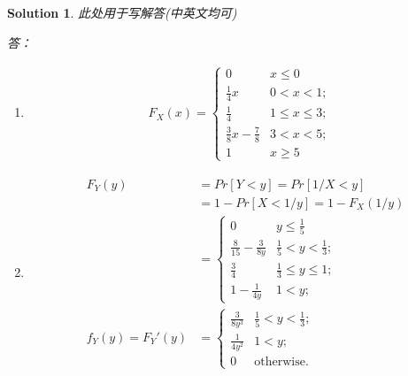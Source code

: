 \documentclass[a4paper,UTF8]{article}
\numberwithin{equation}{section}
\newtheorem*{mySol}{Solution}
\begin{document}
\begin{mySol}
此处用于写解答(中英文均可)

答：
\begin{enumerate}[ {(}1{)}]
\item 
\begin{eqnarray*}
	F_X(x) = 
	\begin{cases}
		0				& x \leq 0 \\
		\frac{1}{4} x 	& 0<x<1;\\
		\frac{1}{4} 	& 1 \leq x \leq 3;\\
		\frac{3}{8} x - \frac{7}{8} & 3<x<5;\\
		1				& x \geq 5 
	\end{cases}
\end{eqnarray*}

\item 
\begin{eqnarray*}
	&F_Y(y)&=Pr[Y<y]=Pr[1/X<y]\\
	&&=1-Pr[X<1/y]=1-F_X(1/y)\\
	&&=
	\begin{cases}
		0				& y \leq \frac{1}{5} \\
		\frac{8}{15}-\frac{3}{8y} &\frac{1}{5}<y<\frac{1}{3};\\
		\frac{3}{4} 	& \frac{1}{3} \leq y \leq 1;\\
		1 - \frac{1}{4y} & 1<y;
	\end{cases}
	\\
	&f_Y(y) = F_Y'(y) &= 
	\begin{cases}
		\frac{3}{8y^3} & \frac{1}{5}<y<\frac{1}{3};\\
		\frac{1}{4y^2} & 1<y;\\
		0					& \mbox{otherwise.}
	\end{cases}
\end{eqnarray*}


\end{enumerate}
\end{mySol}
\end{document}
